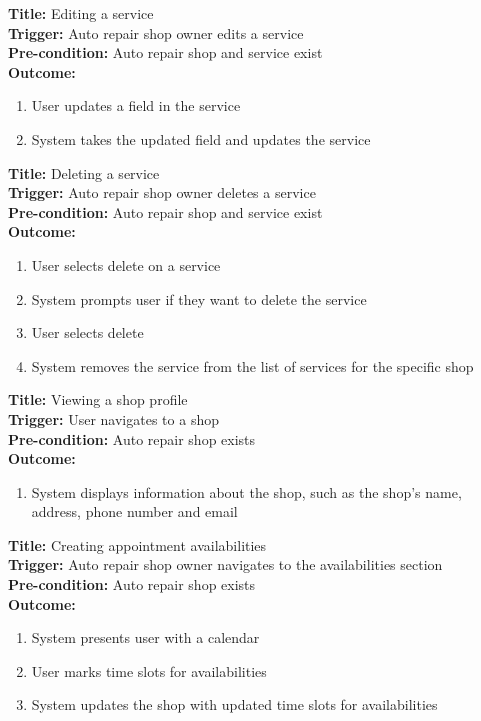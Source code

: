 \documentclass[12pt]{article}
\begin{document}
\textbf{Title:} Editing a service\\
\textbf{Trigger:} Auto repair shop owner edits a service\\
\textbf{Pre-condition:} Auto repair shop and service exist\\
\textbf{Outcome:}
\begin{enumerate}
	\item User updates a field in the service
	\item System takes the updated field and updates the service
\end{enumerate}

\textbf{Title:} Deleting a service\\
\textbf{Trigger:} Auto repair shop owner deletes a service\\
\textbf{Pre-condition:} Auto repair shop and service exist\\
\textbf{Outcome:}
\begin{enumerate}
	\item User selects delete on a service
	\item System prompts user if they want to delete the service
	\item User selects delete
	\item System removes the service from the list of services for the specific shop
\end{enumerate}

\textbf{Title:} Viewing a shop profile\\
\textbf{Trigger:} User navigates to a shop\\
\textbf{Pre-condition:} Auto repair shop exists\\
\textbf{Outcome:}
\begin{enumerate}
	\item System displays information about the shop, such as the shop's name, address, phone number and
	      email
\end{enumerate}

\textbf{Title:} Creating appointment availabilities\\
\textbf{Trigger:} Auto repair shop owner navigates to the availabilities section\\
\textbf{Pre-condition:} Auto repair shop exists\\
\textbf{Outcome:}
\begin{enumerate}
	\item System presents user with a calendar
	\item User marks time slots for availabilities
	\item System updates the shop with updated time slots for availabilities
\end{enumerate}
\end{document}
